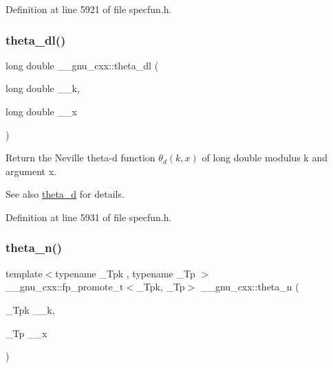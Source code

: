 Definition at line 5921 of file specfun.\+h.

\mbox{\label{group__mathsf__gnu_gacce4474168b9638ebeaad1c7b351fa04}} 
\subsubsection{\texorpdfstring{theta\+\_\+dl()}{theta\_dl()}}
{\footnotesize\ttfamily long double \+\_\+\+\_\+gnu\+\_\+cxx\+::theta\+\_\+dl (\begin{DoxyParamCaption}\item[{long double}]{\+\_\+\+\_\+k,  }\item[{long double}]{\+\_\+\+\_\+x }\end{DoxyParamCaption})\hspace{0.3cm}{\ttfamily [inline]}}

Return the Neville theta-\/d function $ \theta_d(k,x) $ of {\ttfamily long double} modulus {\ttfamily k} and argument {\ttfamily x}.

\begin{DoxySeeAlso}{See also}
\hyperlink{group__mathsf__gnu_ga258edb995137d9e6344b3cd750266d74}{theta\+\_\+d} for details. 
\end{DoxySeeAlso}


Definition at line 5931 of file specfun.\+h.

\mbox{\label{group__mathsf__gnu_ga202778bd650e04e9f3729bfca35c32e2}} 
\subsubsection{\texorpdfstring{theta\+\_\+n()}{theta\_n()}}
{\footnotesize\ttfamily template$<$typename \+\_\+\+Tpk , typename \+\_\+\+Tp $>$ \\
\+\_\+\+\_\+gnu\+\_\+cxx\+::fp\+\_\+promote\+\_\+t$<$\+\_\+\+Tpk, \+\_\+\+Tp$>$ \+\_\+\+\_\+gnu\+\_\+cxx\+::theta\+\_\+n (\begin{DoxyParamCaption}\item[{\+\_\+\+Tpk}]{\+\_\+\+\_\+k,  }\item[{\+\_\+\+Tp}]{\+\_\+\+\_\+x }\end{DoxyParamCaption})\hspace{0.3cm}{\ttfamily [inline]}}

